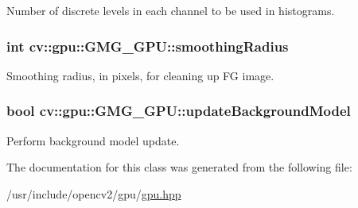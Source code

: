 Number of discrete levels in each channel to be used in histograms. 

\hypertarget{classcv_1_1gpu_1_1GMG__GPU_a5e2cb2fbb20a7a83ac0ae19c0ba3a8a8}{
\subsubsection[{smoothing\-Radius}]{\setlength{\rightskip}{0pt plus 5cm}int cv\-::gpu\-::\-G\-M\-G\-\_\-\-G\-P\-U\-::smoothing\-Radius}}\label{classcv_1_1gpu_1_1GMG__GPU_a5e2cb2fbb20a7a83ac0ae19c0ba3a8a8}


Smoothing radius, in pixels, for cleaning up F\-G image. 

\hypertarget{classcv_1_1gpu_1_1GMG__GPU_a2c756a5e5ec6c2160d6a440642d0909f}{
\subsubsection[{update\-Background\-Model}]{\setlength{\rightskip}{0pt plus 5cm}bool cv\-::gpu\-::\-G\-M\-G\-\_\-\-G\-P\-U\-::update\-Background\-Model}}\label{classcv_1_1gpu_1_1GMG__GPU_a2c756a5e5ec6c2160d6a440642d0909f}


Perform background model update. 



The documentation for this class was generated from the following file\-:\begin{DoxyCompactItemize}
\item 
/usr/include/opencv2/gpu/\hyperlink{gpu_2gpu_8hpp}{gpu.\-hpp}\end{DoxyCompactItemize}
